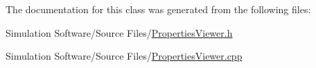 The documentation for this class was generated from the following files\+:\begin{DoxyCompactItemize}
\item 
Simulation Software/\+Source Files/\hyperlink{_properties_viewer_8h}{Properties\+Viewer.\+h}\item 
Simulation Software/\+Source Files/\hyperlink{_properties_viewer_8cpp}{Properties\+Viewer.\+cpp}\end{DoxyCompactItemize}
